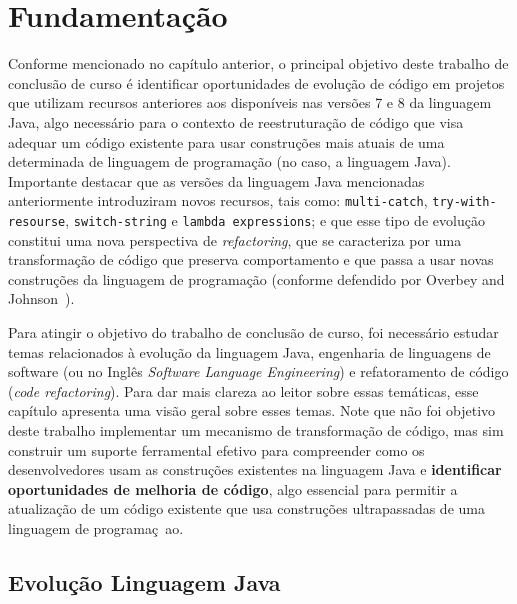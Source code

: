 %
%
\chapter{Fundamentaç\~{a}o}

Conforme mencionado no cap\'{i}tulo anterior, 
o principal objetivo deste trabalho de conclus\~{a}o de curso \'{e} 
identificar oportunidades de evoluç\~{a}o de c\'{o}digo 
em projetos que utilizam recursos anteriores aos dispon\'{i}veis 
nas vers\~{o}es 7 e 8 da linguagem Java, 
algo necess\'{a}rio para o contexto de 
reestrutura\c c\~{a}o de c\'{o}digo que visa adequar um c\'{o}digo 
existente para usar constru\c c\~{o}es mais atuais 
de uma determinada de linguagem de programa\c c\~{a}o 
(no caso, a linguagem Java). Importante destacar 
que as vers\~{o}es da linguagem Java mencionadas anteriormente
introduziram novos recursos, tais como: 
\texttt{multi-catch}, \texttt{try-with-resourse}, \texttt{switch-string} 
e \texttt{lambda expressions}; e que esse tipo de 
evoluç\~{a}o constitui uma nova perspectiva 
de \textit{refactoring}, que se caracteriza 
por uma transforma\c c\~{a}o de c\'{o}digo que 
preserva comportamento e que passa a usar  
novas constru\c c\~{o}es da linguagem de programa\c c\~{a}o 
(conforme defendido por Overbey and Johnson~\cite{Overbey:2009}). 

Para atingir o objetivo do trabalho de conclus\~{a}o de curso, 
foi necess\'{a}rio estudar temas relacionados 
\`{a} evolu\c c\~{a}o da linguagem Java, engenharia de 
linguagens de software (ou no Ingl\^{e}s \emph{Software 
Language Engineering}) e refatoramento de c\'{o}digo 
(\emph{code refactoring}). Para dar mais clareza ao leitor 
sobre essas tem\'{a}ticas, esse cap\'{i}tulo apresenta 
uma vis\~{a}o geral sobre esses temas. Note que n\~{a}o foi objetivo
deste trabalho implementar um mecanismo de transforma\c c\~{a}o 
de c\'{o}digo, mas sim construir um suporte ferramental 
efetivo para compreender como os desenvolvedores usam as 
constru\c c\~{o}es existentes na linguagem Java e {\bf identificar 
oportunidades de melhoria de c\'{o}digo}, algo essencial para 
permitir a atualiza\c c\~{a}o de um c\'{o}digo existente 
que usa constru\c c\~{o}es ultrapassadas de uma 
linguagem de programa\c c~{a}o. 
 
\section{Evoluç\~{a}o Linguagem Java}\label{sec:evolucaoJava}



